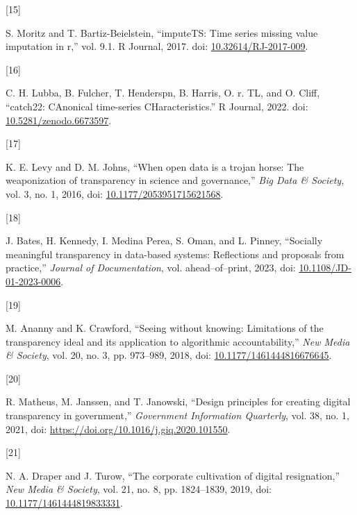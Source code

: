 \documentclass{article}
\newlength{\cslhangindent}
\newlength{\csllabelwidth}
\newlength{\cslentryspacingunit} %
\newenvironment{CSLReferences}[2] %
 {%
  \setlength{\parindent}{0pt}
  \ifodd #1
  \let\oldpar\par
  \def\par{\hangindent=\cslhangindent\oldpar}
  \fi
  \setlength{\parskip}{#2\cslentryspacingunit}
 }%
 {}
\newcommand{\CSLLeftMargin}[1]{\parbox[t]{\csllabelwidth}{#1}}
\newcommand{\CSLRightInline}[1]{\parbox[t]{\linewidth - \csllabelwidth}{#1}\break}
\begin{document}
\begin{CSLReferences}{0}{0}
\leavevmode{}%
\CSLLeftMargin{{[}15{]} }%
\CSLRightInline{S. Moritz and T. Bartiz-Beielstein, {``imputeTS: Time
series missing value imputation in r,''} vol. 9.1. R Journal, 2017. doi:
\href{https://doi.org/10.32614/RJ-2017-009}{10.32614/RJ-2017-009}.}

\leavevmode{}%
\CSLLeftMargin{{[}16{]} }%
\CSLRightInline{C. H. Lubba, B. Fulcher, T. Henderspn, B. Harris, O. r.
TL, and O. Cliff, {``catch22: CAnonical time-series CHaracteristics.''}
R Journal, 2022. doi:
\href{https://doi.org/10.5281/zenodo.6673597}{10.5281/zenodo.6673597}.}

\leavevmode{}%
\CSLLeftMargin{{[}17{]} }%
\CSLRightInline{K. E. Levy and D. M. Johns, {``When open data is a
trojan horse: The weaponization of transparency in science and
governance,''} \emph{Big Data \& Society}, vol. 3, no. 1, 2016, doi:
\href{https://doi.org/10.1177/2053951715621568}{10.1177/2053951715621568}.}

\leavevmode{}%
\CSLLeftMargin{{[}18{]} }%
\CSLRightInline{J. Bates, H. Kennedy, I. Medina Perea, S. Oman, and L.
Pinney, {``Socially meaningful transparency in data-based systems:
Reflections and proposals from practice,''} \emph{Journal of
Documentation}, vol. ahead--of--print, 2023, doi:
\href{https://doi.org/10.1108/JD-01-2023-0006}{10.1108/JD-01-2023-0006}.}

\leavevmode{}%
\CSLLeftMargin{{[}19{]} }%
\CSLRightInline{M. Ananny and K. Crawford, {``Seeing without knowing:
Limitations of the transparency ideal and its application to algorithmic
accountability,''} \emph{New Media \& Society}, vol. 20, no. 3, pp.
973--989, 2018, doi:
\href{https://doi.org/10.1177/1461444816676645}{10.1177/1461444816676645}.}

\leavevmode{}%
\CSLLeftMargin{{[}20{]} }%
\CSLRightInline{R. Matheus, M. Janssen, and T. Janowski, {``Design
principles for creating digital transparency in government,''}
\emph{Government Information Quarterly}, vol. 38, no. 1, 2021, doi:
\url{https://doi.org/10.1016/j.giq.2020.101550}.}

\leavevmode{}%
\CSLLeftMargin{{[}21{]} }%
\CSLRightInline{N. A. Draper and J. Turow, {``The corporate cultivation
of digital resignation,''} \emph{New Media \& Society}, vol. 21, no. 8,
pp. 1824--1839, 2019, doi:
\href{https://doi.org/10.1177/1461444819833331}{10.1177/1461444819833331}.}


\end{CSLReferences}
\end{document}
